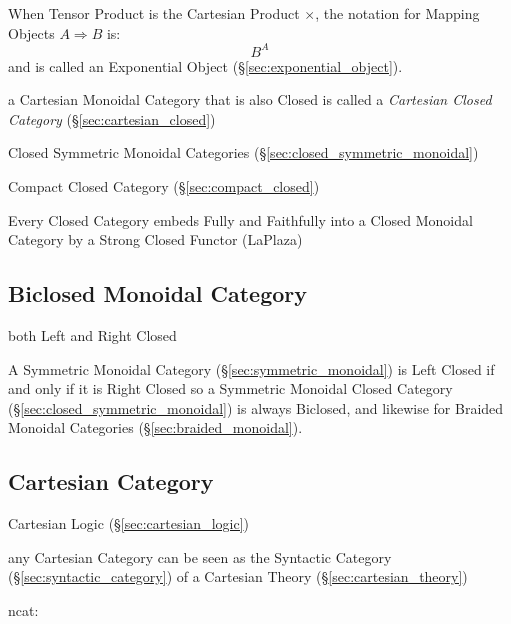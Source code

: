 When Tensor Product is the Cartesian Product $\times$, the notation
for Mapping Objects $A \Rightarrow B$ is:
\[
  B^A
\]
and is called an Exponential Object (\S\ref{sec:exponential_object}).

a Cartesian Monoidal Category that is also Closed is called a \emph{Cartesian
  Closed Category} (\S\ref{sec:cartesian_closed})

Closed Symmetric Monoidal Categories
(\S\ref{sec:closed_symmetric_monoidal})

Compact Closed Category (\S\ref{sec:compact_closed})

Every Closed Category embeds Fully and Faithfully into a Closed
Monoidal Category by a Strong Closed Functor (LaPlaza)



\subsection{Biclosed Monoidal Category}\label{sec:biclosed_monoidal}

both Left and Right Closed

A Symmetric Monoidal Category (\S\ref{sec:symmetric_monoidal}) is Left
Closed if and only if it is Right Closed so a Symmetric Monoidal
Closed Category (\S\ref{sec:closed_symmetric_monoidal}) is always
Biclosed, and likewise for Braided Monoidal Categories
(\S\ref{sec:braided_monoidal}).



\subsection{Cartesian Category}\label{sec:cartesian_category}

Cartesian Logic (\S\ref{sec:cartesian_logic})

any Cartesian Category can be seen as the Syntactic Category
(\S\ref{sec:syntactic_category}) of a Cartesian Theory
(\S\ref{sec:cartesian_theory})

ncat:

